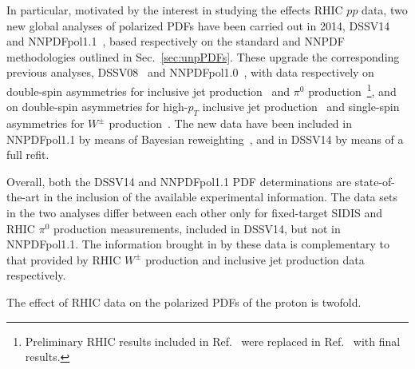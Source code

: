 In particular, motivated by the interest in studying the effects RHIC $pp$ 
data, two new global analyses of polarized PDFs have been carried out in
2014, DSSV14~\cite{deFlorian:2014yva} and NNPDFpol1.1~\cite{Nocera:2014gqa},
based respectively on the standard and NNPDF methodologies outlined 
in Sec.~\ref{sec:unpPDFs}.
%
These upgrade the corresponding previous analyses, 
DSSV08~\cite{deFlorian:2008mr} and 
NNPDFpol1.0~\cite{Ball:2013lla}, with data respectively on double-spin 
asymmetries for inclusive jet production~\cite{Adamczyk:2014ozi} 
and $\pi^0$ production~\cite{Adare:2014hsq}\footnote{Preliminary RHIC results 
included in Ref.~\cite{deFlorian:2008mr} were replaced in
Ref.~\cite{deFlorian:2014yva} with final results.}, 
and on double-spin asymmetries for high-$p_T$ inclusive jet 
production~\cite{Adamczyk:2014ozi,Adamczyk:2012qj,Adare:2010cc} and single-spin
asymmetries for $W^\pm$ production~\cite{Adamczyk:2014xyw}.
%
The new data have been included in NNPDFpol1.1 
by means of Bayesian reweighting~\cite{Ball:2010gb},
and in DSSV14 by means of a full refit.  

Overall, both the DSSV14 and NNPDFpol1.1 PDF determinations are 
state-of-the-art in the inclusion of the available experimental information. 
%
The data sets in the two analyses differ between each other only for 
fixed-target SIDIS and RHIC $\pi^0$ production measurements, included in 
DSSV14, but not in NNPDFpol1.1. 
%
The information brought in by these data is complementary to that provided by 
RHIC $W^\pm$ production and inclusive jet production data respectively. 

The effect of RHIC data on the polarized PDFs of the proton is twofold. 
 
